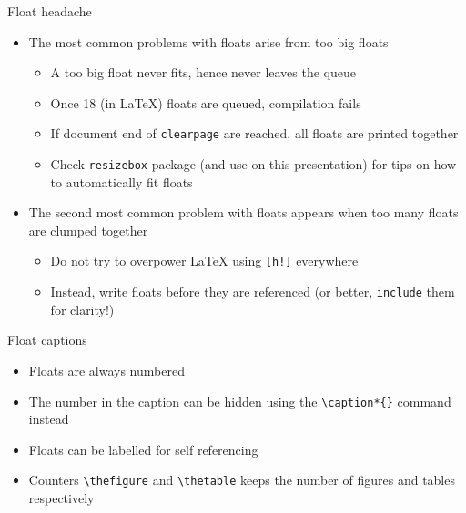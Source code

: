 \documentclass[english]{beamer}
\let\olditem\item
\renewcommand{\item}{\setlength{\itemsep}{\fill}\olditem}
\newenvironment{sitemize}{\let\item\olditem \begin{itemize}}{\vfill\end{itemize}}
\let\textttt\texttt
\renewcommand{\texttt}[1]{\colorbox{gray!10}{\textttt{#1}}}
\begin{document}
\begin{frame}{Float headache}
    \begin{itemize}
        \item The most common problems with floats arise from too big floats
        \begin{sitemize}
            \item A too big float never fits, hence never leaves the queue
            \item Once 18 (in \LaTeX) floats are queued, compilation fails
            \item If document end of \texttt{clearpage} are reached, all floats are printed together
            \item Check \texttt{resizebox} package (and use on this presentation) for tips on how to automatically fit floats
        \end{sitemize}
        \item The second most common problem with floats appears when too many floats are clumped together
        \begin{sitemize}
            \item Do not try to overpower \LaTeX{} using \texttt{[h!]} everywhere
            \item Instead, write floats before they are referenced (or better, \texttt{include} them for clarity!)
        \end{sitemize}
    \end{itemize}
\end{frame}

\begin{frame}[fragile]{Float captions}
    \begin{itemize}
        \item Floats are always numbered
        \item The number in the caption can be hidden using the \verb|\caption*{}| command instead
        \item Floats can be labelled for self referencing
        \item Counters \verb|\thefigure| and \verb|\thetable| keeps the number of figures and tables respectively
    \end{itemize}
\end{frame}
\end{document}
